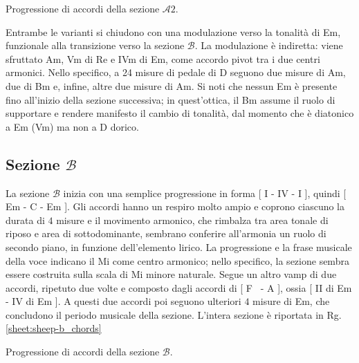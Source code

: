 \documentclass[class=book, crop=false, oneside, 12pt]{standalone}
\begin{document}
    \begin{sheet}[htbp]
        \centering
        \caption{Progressione di accordi della sezione \(\mathcal{A}2\).}
        \label{sheet:sheep-a2_chords}
    \end{sheet}

    Entrambe le varianti si chiudono con una modulazione verso la tonalità di Em, funzionale alla transizione verso la sezione \(\mathcal{B}\). La modulazione è indiretta: viene sfruttato Am, Vm di Re e IVm di Em,  come accordo pivot tra i due centri armonici. Nello specifico, a 24 misure di pedale di D seguono due misure di Am, due di Bm e, infine, altre due misure di Am. Si noti che nessun Em è presente fino all'inizio della sezione successiva; in quest'ottica,  il Bm assume il ruolo di supportare e rendere manifesto il cambio di tonalità, dal momento che è diatonico a Em (Vm) ma non a D dorico. 

    \subsection*{Sezione \(\mathcal{B}\)}
    La sezione \(\mathcal{B}\) inizia con una semplice progressione in forma [ I - IV - I ], quindi [ Em - C - Em ]. Gli accordi hanno un respiro molto ampio e coprono ciascuno la durata di \(4\) misure e il movimento armonico, che rimbalza tra area tonale di riposo e area di sottodominante, sembrano conferire all'armonia un ruolo di secondo piano, in funzione dell'elemento lirico. La progressione e la frase musicale della voce indicano il Mi come centro armonico; nello specifico, la sezione sembra essere costruita sulla scala di Mi minore naturale.
    Segue un altro vamp di due accordi, ripetuto due volte e composto dagli accordi di [ F\sharp~ - A ], ossia [ II di Em - IV di Em ].  A questi due accordi poi seguono ulteriori \(4\) misure di Em, che concludono il periodo musicale della sezione. L'intera sezione è riportata in Rg.\ref{sheet:sheep-b_chords}

    \begin{sheet}[htbp]
        \centering
        \caption{Progressione di accordi della sezione \(\mathcal{B}\).}
        \label{sheet:sheep-b_chords}
    \end{sheet}
    
\end{document}
